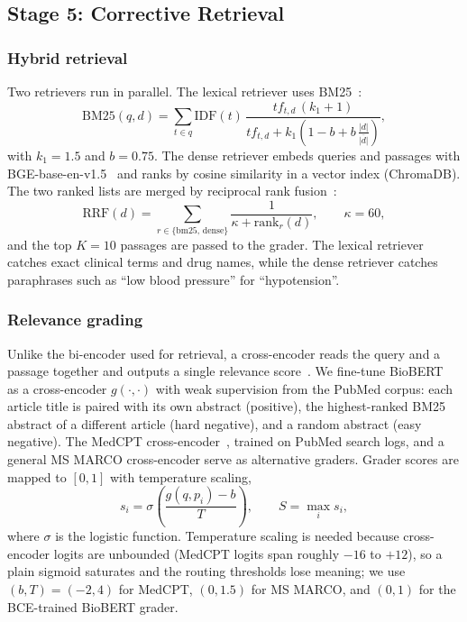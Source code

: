 \documentclass[conference]{IEEEtran}
\begin{document}
\subsection{Stage 5: Corrective Retrieval}

\subsubsection{Hybrid retrieval}
Two retrievers run in parallel. The lexical retriever uses
BM25~\cite{robertson2009bm25}:
\begin{equation}
\mathrm{BM25}(q,d) = \sum_{t \in q} \mathrm{IDF}(t)\,
\frac{tf_{t,d}\,(k_1+1)}{tf_{t,d} + k_1\left(1-b+b\,\frac{|d|}{\overline{|d|}}\right)},
\end{equation}
with $k_1=1.5$ and $b=0.75$. The dense retriever embeds queries and
passages with BGE-base-en-v1.5~\cite{xiao2023bge} and ranks by cosine
similarity in a vector index (ChromaDB). The two ranked lists are merged by
reciprocal rank fusion~\cite{cormack2009rrf}:
\begin{equation}
\mathrm{RRF}(d) = \sum_{r \in \{\text{bm25},\,\text{dense}\}}
\frac{1}{\kappa + \mathrm{rank}_r(d)}, \qquad \kappa = 60,
\end{equation}
and the top $K=10$ passages are passed to the grader. The lexical retriever
catches exact clinical terms and drug names, while the dense retriever
catches paraphrases such as ``low blood pressure'' for ``hypotension''.

\subsubsection{Relevance grading}
Unlike the bi-encoder used for retrieval, a cross-encoder reads the query
and a passage together and outputs a single relevance
score~\cite{nogueira2019bert}. We fine-tune BioBERT~\cite{lee2020biobert}
as a cross-encoder $g(\cdot,\cdot)$ with weak supervision from the PubMed
corpus: each article title is paired with its own abstract (positive), the
highest-ranked BM25 abstract of a different article (hard negative), and a
random abstract (easy negative). The MedCPT
cross-encoder~\cite{jin2023medcpt}, trained on PubMed search logs, and a
general MS MARCO cross-encoder serve as alternative graders. Grader scores
are mapped to $[0,1]$ with temperature scaling,
\begin{equation}
s_i = \sigma\!\left(\frac{g(q, p_i) - b}{T}\right), \qquad S = \max_{i} s_i ,
\end{equation}
where $\sigma$ is the logistic function. Temperature scaling is needed
because cross-encoder logits are unbounded (MedCPT logits span roughly
$-16$ to $+12$), so a plain sigmoid saturates and the routing thresholds
lose meaning; we use $(b,T)=(-2,4)$ for MedCPT, $(0,1.5)$ for MS MARCO, and
$(0,1)$ for the BCE-trained BioBERT grader.
\end{document}
